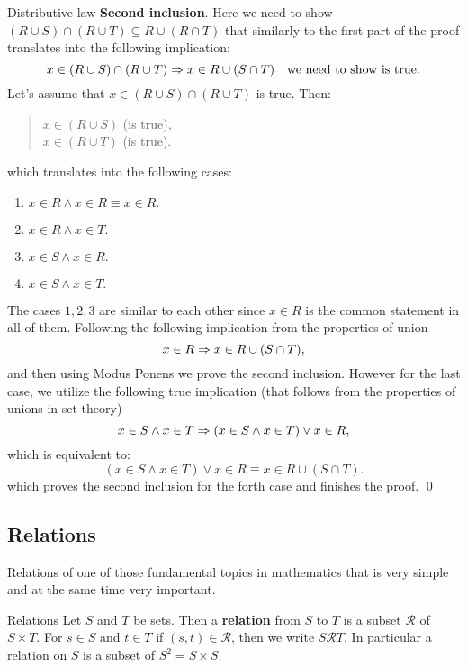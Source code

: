 \begin{example}{Distributive law}
	\textbf{Second inclusion}. Here we need to show $ (R \cup S ) \cap (R \cup T) \subseteq R \cup (R \cap T) $ that similarly to the first part of the proof translates into the following implication:
	\[ x \in (R \cup S ) \cap (R \cup T) \Rightarrow x \in R \cup (S \cap T) \quad \text{we need to show is true.} \]
	Let's assume that $ x \in (R \cup S) \cap (R \cup T) $ is true. Then:
	\begin{quote}
		\centering
		$ x \in (R \cup S) $ (is true), \\
		$ x \in (R \cup T) $ (is true).
	\end{quote}
	which translates into the following cases:
	\begin{enumerate}
		\item $ x \in R \wedge x \in R \equiv x \in R.$
		\item $ x \in R \wedge x \in T. $
		\item $ x \in S \wedge x \in R. $
		\item $ x \in S \wedge x \in T. $
	\end{enumerate}

	The cases $ 1,2,3 $ are similar to each other since $ x \in R $ is the common statement in all of them. Following the following implication from the properties of union
	\[ x \in R \Rightarrow x \in R \cup (S \cap T), \]
	and then using Modus Ponens we prove the second inclusion. 
	However for the last case, we utilize the following true implication (that follows from the properties of unions in set theory)
	\[ x \in S \wedge x \in T  \Rightarrow (x \in S \wedge x \in T) \vee  x \in R, \]
	which is equivalent to:
	\[ (x \in S \wedge x \in T) \vee  x \in R \equiv x \in R \cup (S \cap T). \]
	which proves the second inclusion for the forth case and finishes the proof. \qed
\end{example}


\subsection{Relations}
Relations of one of those fundamental topics in mathematics that is very simple and at the same time very important.

\begin{defbox}{Relations}
	Let $ S $ and $ T $ be sets. Then a \textbf{relation} from $ S $ to $ T $ is a subset $ \mathcal{R} $ of $ S \times T$. For $ s \in S $ and $ t \in T $ if $ (s,t) \in \mathcal{R} $, then we write $ S \mathcal{R} T $. In particular a relation on $ S $ is a subset of $ S^2 = S \times S $.
\end{defbox}

